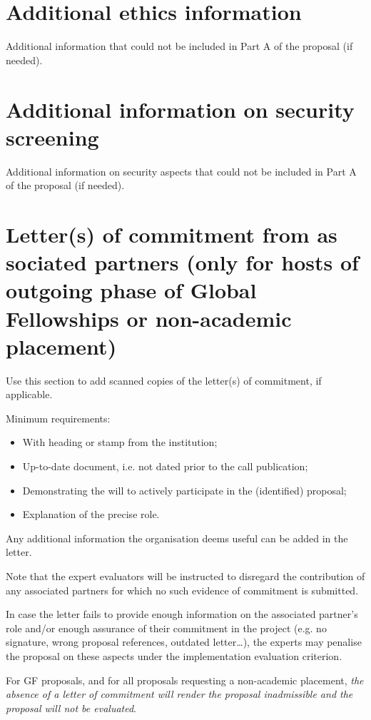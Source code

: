 \documentclass[11pt,draftproposal]{msca-pf}
\begin{document}
\section{Additional ethics information}

Additional information that could not be included in Part A of the proposal (if needed).

\section{Additional information on security screening}

Additional information on security aspects that could not be included in Part
A of the proposal (if needed).

\section{Letter(s) of commitment from as
    sociated partners (only for hosts of
    outgoing phase of Global Fellowships or non-academic placement)}

Use this section to add scanned copies of the letter(s) of commitment, if applicable.

Minimum requirements:

\begin{itemize}
    \item With heading or stamp from the institution;
    \item Up-to-date document, i.e. not dated prior to the call publication;
    \item Demonstrating the will to actively participate in the (identified) proposal;
    \item Explanation of the precise role.
\end{itemize}

Any additional information the organisation deems useful can be added in the letter.

Note that the expert evaluators will be instructed to disregard the contribution
of any associated partners for which no such evidence of commitment is submitted.

In case the letter fails to provide enough information on the associated partner's
role and/or enough assurance of their commitment in the project (e.g. no signature,
wrong proposal references, outdated letter…), the experts may penalise the
proposal on these aspects under the implementation evaluation criterion.

For GF proposals, and for all proposals requesting a non-academic placement,
\emph{the absence of a letter of commitment will render the proposal inadmissible
and the proposal will not be evaluated}.
\end{document}
